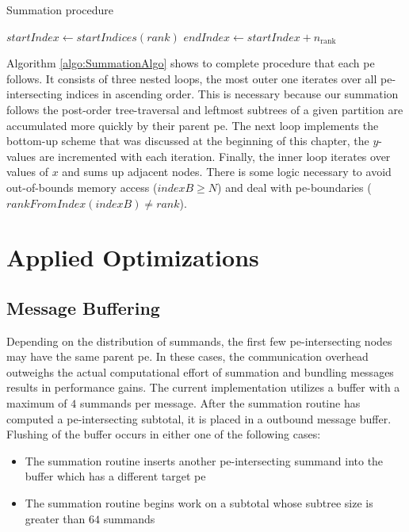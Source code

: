 \begin{algorithm}
\caption{Summation procedure}\label{algo:SummationAlgo}
\DontPrintSemicolon
\SetAlgoLined
$startIndex \gets startIndices (rank)$\;
$endIndex \gets startIndex + n_{\textrm{rank}}$\;
\end{algorithm}

Algorithm \ref{algo:SummationAlgo} shows to complete procedure that each \gls{pe} follows. It consists of three nested loops, the most outer one
iterates over all \gls{pe}-intersecting indices in ascending order.
This is necessary because our summation follows the post-order tree-traversal and leftmost subtrees of a given partition are accumulated more quickly
by their parent \gls{pe}. The next loop implements the bottom-up scheme that was discussed at the beginning of this chapter, the $y$-values are
incremented with each iteration. Finally, the inner loop iterates over values of $x$ and sums up adjacent nodes. There is some logic necessary to avoid
out-of-bounds memory access ($indexB \geq N$) and deal with \gls{pe}-boundaries ($rankFromIndex(indexB) \neq rank$).

\section{Applied Optimizations}
\label{sec:AppliedOptimizations}

\subsection{Message Buffering}
\label{sec:MessageBuffering}

Depending on the distribution of summands, the first few \gls{pe}-intersecting nodes may have the same parent \gls{pe}. In these cases, the communication
overhead outweighs the actual computational effort of summation and bundling messages results in performance gains. The current implementation
utilizes a buffer with a maximum of $4$ summands per message. After the summation routine has computed a \gls{pe}-intersecting subtotal, it is placed
in a outbound message buffer. Flushing of the buffer occurs in either one of the following cases: \begin{itemize}
\item The summation routine inserts another \gls{pe}-intersecting summand into the buffer which has a different target \gls{pe}
\item The summation routine begins work on a subtotal whose subtree size is greater than $64$ summands
\end{itemize}

